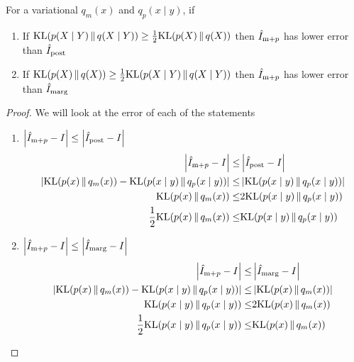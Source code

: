 \renewcommand\thetheorem{4.10}
\begin{lemma}
    For a variational $q_m(x)$ and $q_p(x\mid y)$, if 
    \begin{enumerate}
      \item If $\mathrm{KL}(p(X\mid Y)\,\|\,q(X\mid Y))\geq \frac{1}{2}\mathrm{KL}(p(X)\,\|\,q(X))$ 
      then $\hat{I}_{\text{m}+p}$ has lower error than $\hat{I}_{\text{post}}$
      \item If $\mathrm{KL}(p(X)\,\|\,q(X))\geq \frac{1}{2}\mathrm{KL}(p(X\mid Y)\,\|\,q(X\mid Y))$ 
      then $\hat{I}_{\text{m}+p}$ has lower error than $\hat{I}_{\text{marg}}$
    \end{enumerate}
  \end{lemma}
\begin{proof}
  We will look at the error of each of the statements
    \begin{enumerate}
      \item $\left|\hat{I}_{\text{m}+p}-I\right|\leq \left|\hat{I}_{\text{post}}-I\right|$
      \begin{align*}
        \left|\hat{I}_{\text{m}+p}-I\right|\leq& \left|\hat{I}_{\text{post}}-I\right|\\
        \left|\mathrm{KL}(p(x)\,\|\,q_m(x))-\mathrm{KL}(p(x\mid y)\,\|\,q_p(x\mid y))\right|\leq& \left|\mathrm{KL}(p(x\mid y)\,\|\,q_p(x\mid y))\right|\\
        \mathrm{KL}(p(x)\,\|\,q_m(x))\leq& 2\mathrm{KL}(p(x\mid y)\,\|\,q_p(x\mid y))\\
        \frac{1}{2}\mathrm{KL}(p(x)\,\|\,q_m(x))\leq& \mathrm{KL}(p(x\mid y)\,\|\,q_p(x\mid y))\\
      \end{align*}
      \item $\left|\hat{I}_{\text{m}+p}-I\right|\leq \left|\hat{I}_{\text{marg}}-I\right|$
      \begin{align*}
        \left|\hat{I}_{\text{m}+p}-I\right|\leq& \left|\hat{I}_{\text{marg}}-I\right|\\
        \left|\mathrm{KL}(p(x)\,\|\,q_m(x))-\mathrm{KL}(p(x\mid y)\,\|\,q_p(x\mid y))\right|\leq& \left|\mathrm{KL}(p(x)\,\|\,q_m(x))\right|\\
        \mathrm{KL}(p(x\mid y)\,\|\,q_p(x\mid y))\leq& 2\mathrm{KL}(p(x)\,\|\,q_m(x))\\
        \frac{1}{2}\mathrm{KL}(p(x\mid y)\,\|\,q_p(x\mid y))\leq& \mathrm{KL}(p(x)\,\|\,q_m(x))\\
      \end{align*}
    \end{enumerate}
\end{proof}

